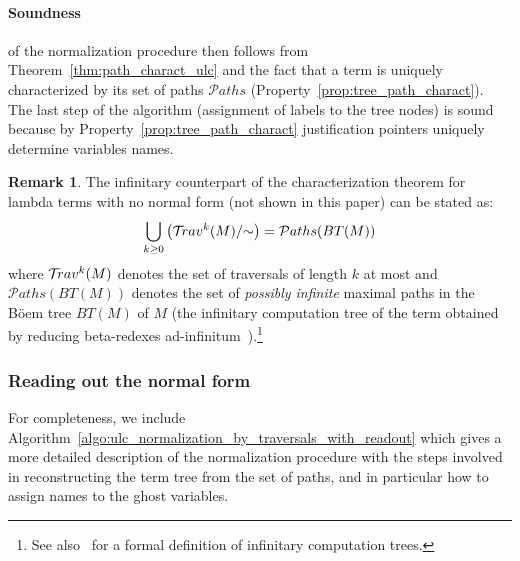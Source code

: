 \documentclass{article}
\theoremstyle{definition}
\newtheorem{remark}{Remark}[section]
\newcommand{\travulc}{\travset}
\newcommand\pathset{{\mathcal{P}aths}} %
\begin{document}
\paragraph{Soundness} of the normalization procedure then follows from Theorem~\ref{thm:path_charact_ulc} and the fact that a term is uniquely characterized by its set of paths $\pathset$ (Property~\ref{prop:tree_path_charact}). The last step of the algorithm (assignment of labels to the tree nodes) is sound because by Property~\ref{prop:tree_path_charact} justification pointers uniquely determine variables names.

\begin{remark}
The infinitary counterpart of the characterization theorem for lambda terms with no normal form (not shown in this paper) can be stated as:
$$ \Union_{k\geq0} \left(\travulc^k(M)/{\sim}\right) = \pathset(BT(M))$$
where $\travulc^k(M)$ denotes the set of traversals of length $k$ at most and $\pathset(BT(M))$ denotes the set of \emph{possibly infinite} maximal paths in the B\"oem tree $BT(M)$ of $M$ (the infinitary computation tree of the term obtained by reducing beta-redexes ad-infinitum~\cite{barendregt2013lambda}).\footnote{See also~\cite{Blum17-HomogNotRestriction, Ong2006} for a formal definition of infinitary computation trees.}
\end{remark}


\subsubsection{Reading out the normal form}

For completeness, we include Algorithm~\ref{algo:ulc_normalization_by_traversals_with_readout} which gives a more
detailed description of the normalization procedure with the steps involved in reconstructing the term tree from the set of paths, and in particular how to assign names to the ghost variables.
\end{document}
